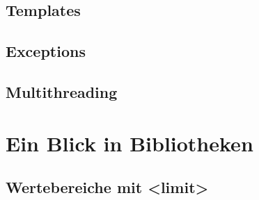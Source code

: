 \documentclass[a4paper]{report}
\begin{document}
\section{Templates}
\section{Exceptions}
\section{Multithreading}

\chapter{Ein Blick in Bibliotheken}

\section{Wertebereiche mit <limit>}
\end{document}
